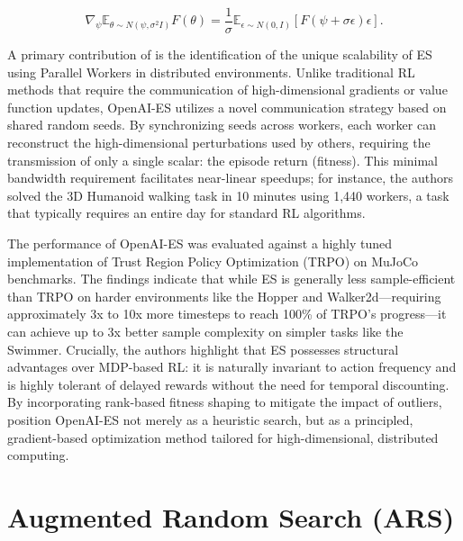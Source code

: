 \begin{equation}
\nabla_{\psi} \mathbb{E}_{\theta \sim N(\psi, \sigma^2 I)} F(\theta) = \frac{1}{\sigma} \mathbb{E}_{\epsilon \sim N(0, I)} [F(\psi + \sigma\epsilon)\epsilon].
\end{equation}

A primary contribution of \citep{salimans2017es} is the identification of the unique scalability of ES using Parallel Workers in distributed environments. Unlike traditional RL methods that require the communication of high-dimensional gradients or value function updates, OpenAI-ES utilizes a novel communication strategy based on shared random seeds. By synchronizing seeds across workers, each worker can reconstruct the high-dimensional perturbations used by others, requiring the transmission of only a single scalar: the episode return (fitness). This minimal bandwidth requirement facilitates near-linear speedups; for instance, the authors solved the 3D Humanoid walking task in 10 minutes using 1,440 workers, a task that typically requires an entire day for standard RL algorithms.

The performance of OpenAI-ES was evaluated against a highly tuned implementation of Trust Region Policy Optimization (TRPO) on MuJoCo benchmarks. The findings indicate that while ES is generally less sample-efficient than TRPO on harder environments like the Hopper and Walker2d—requiring approximately 3x to 10x more timesteps to reach 100\% of TRPO's progress—it can achieve up to 3x better sample complexity on simpler tasks like the Swimmer. Crucially, the authors highlight that ES possesses structural advantages over MDP-based RL: it is naturally invariant to action frequency and is highly tolerant of delayed rewards without the need for temporal discounting. By incorporating rank-based fitness shaping to mitigate the impact of outliers, \citep{salimans2017es} position OpenAI-ES not merely as a heuristic search, but as a principled, gradient-based optimization method tailored for high-dimensional, distributed computing.

\section{Augmented Random Search (ARS)}

